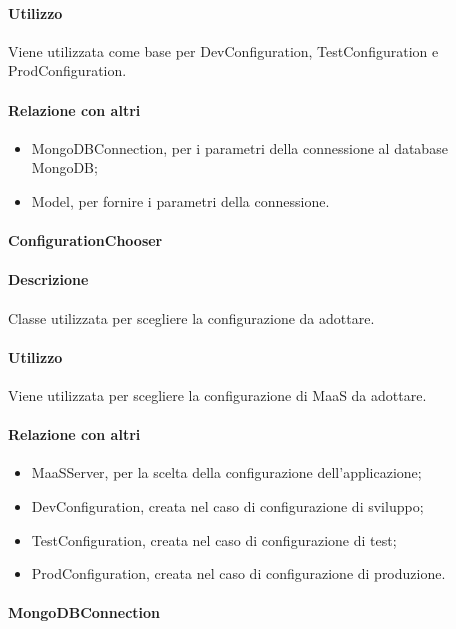 \paragraph*{Utilizzo}
Viene utilizzata come base per DevConfiguration, TestConfiguration e ProdConfiguration.

\paragraph*{Relazione con altri }
\begin{itemize}
\item MongoDBConnection, per i parametri della connessione al database MongoDB;
\item Model, per fornire i parametri della connessione.
\end{itemize}

\paragraph{ConfigurationChooser}
\paragraph*{Descrizione}
Classe utilizzata per scegliere la configurazione da adottare.

\paragraph*{Utilizzo}
Viene utilizzata per scegliere la configurazione di MaaS da adottare.

\paragraph*{Relazione con altri }
\begin{itemize}
\item MaaSServer, per la scelta della configurazione dell'applicazione;
\item DevConfiguration, creata nel caso di configurazione di sviluppo;
\item TestConfiguration, creata nel caso di configurazione di test;
\item ProdConfiguration, creata nel caso di configurazione di produzione.
\end{itemize}

\paragraph{MongoDBConnection}
